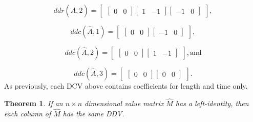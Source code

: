 \documentclass[10pt,letterpaper]{article}
\newtheorem{thm}{Theorem}[section]
\numberwithin{equation}{section}
\begin{document}
\[ ddr(\hat A, 2) = \left[ \begin{matrix} \left[ \begin{matrix} 0 &
        0 \end{matrix} \right] \left[ \begin{matrix} 1 &
        -1 \end{matrix} \right] \left[ \begin{matrix} -1 &
        0 \end{matrix} \right] \end{matrix} \right] , \]

\[ ddc(\hat A, 1) = \left[ \begin{matrix} \left[ \begin{matrix} 0 &
        0 \end{matrix} \right] \left[ \begin{matrix} -1 &
        0 \end{matrix} \right] \end{matrix} \right] , \]

\[ ddc(\hat A, 2) = \left[ \begin{matrix} \left[ \begin{matrix} 0 &
        0 \end{matrix} \right] \left[ \begin{matrix} 1 &
        -1 \end{matrix} \right] \end{matrix} \right] , \mbox{and} \]

\[ ddc(\hat A, 3) = \left[ \begin{matrix} \left[ \begin{matrix} 0 &
        0 \end{matrix} \right] \left[ \begin{matrix} 0 &
        0 \end{matrix} \right] \end{matrix} \right] . \] As
previously, each DCV above contains coefficients for length and time
only.

\begin{thm} \label{if_IL_then_same_col_ddvs} If an $n \times n$
  dimensional value matrix $\hat M$ has a left-identity, then each
  column of $\hat M$ has the same DDV.\end{thm}
\end{document}
